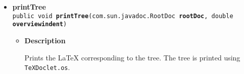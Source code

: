 \documentclass[11pt,a4paper]{report}
\begin{document}
{{\begin{itemize}
{\begin{itemize}
{Prints a branch of the tree. The branch is printed using \texttt{\small TeXDoclet.os}.
}
\end{itemize}
}%
\item{ 
\hypertarget{org.stfm.texdoclet.InterfaceHierachy.printTree(com.sun.javadoc.RootDoc, double)}{{\bf  printTree}\\}
\texttt{public void\ {\bf  printTree}(\texttt{com.sun.javadoc.RootDoc} {\bf  rootDoc},
\texttt{double} {\bf  overviewindent})
\label{org.stfm.texdoclet.InterfaceHierachy.printTree(com.sun.javadoc.RootDoc, double)}}%
\begin{itemize}
\item{
{\bf  Description}

Prints the \LaTeX{} corresponding to the tree. The tree is printed using \texttt{\small TeXDoclet.os}.
}
\end{itemize}
}%
\end{itemize}
}
}
\end{document}

